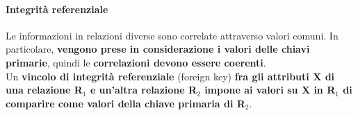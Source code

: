 \documentclass[10pt]{book}
\begin{document}
\paragraph{Integrità referenziale} Le informazioni in relazioni diverse sono correlate attraverso valori comuni. In particolare, \textbf{vengono prese in considerazione i valori delle chiavi primarie}, quindi le \textbf{correlazioni devono essere coerenti}.\\
Un \textbf{vincolo di integrità referenziale} (foreign key) \textbf{fra gli attributi X di una relazione R$_1$ e un'altra relazione R$_2$ impone ai valori su X in R$_1$ di comparire come valori della chiave primaria di R$_2$}.
\end{document}
